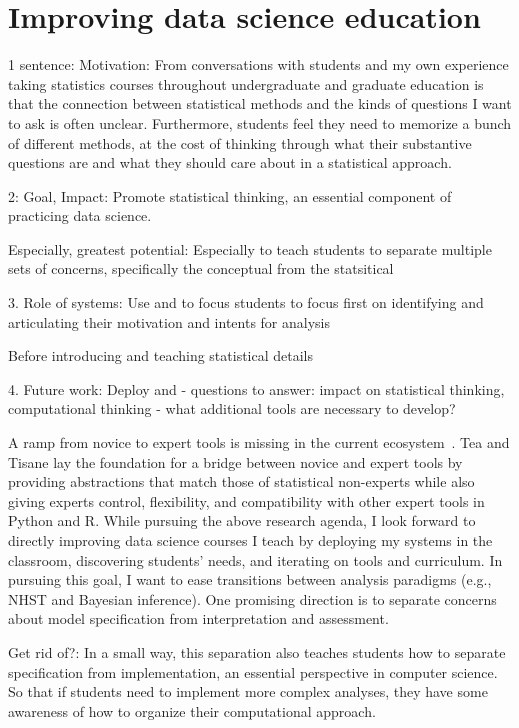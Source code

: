 \section{Improving data science education}

1 sentence: Motivation: From conversations with students and my own experience taking statistics courses
throughout undergraduate and graduate education is that the connection between
statistical methods and the kinds of questions I want to ask is often unclear.
Furthermore, students feel they need to memorize a bunch of different methods,
at the cost of thinking through what their substantive questions are and what
they should care about in a statistical approach. 

2: Goal, Impact: Promote statistical thinking, an essential component of practicing data science. 

Especially, greatest potential: Especially to teach students to separate
multiple sets of concerns, specifically the conceptual from the statsitical 

3. Role of systems: Use \tea and \tisane to focus students to focus first on identifying and
articulating their motivation and intents for analysis 

Before introducing and teaching statistical details

4. Future work: Deploy \tea and \tisane 
- questions to answer: impact on statistical thinking, computational thinking 
- what additional tools are necessary to develop? 

A ramp from novice to expert
tools is missing in the current ecosystem~\cite{mcnamara2018keyAttributes}. Tea
and Tisane lay the foundation for a bridge between novice and expert tools by
providing abstractions that match those of statistical non-experts while also
giving experts control, flexibility, and compatibility with other expert tools
in Python and R. While pursuing the above research agenda, I look forward to
directly improving data science courses I teach by deploying my systems in the
classroom, discovering students' needs, and iterating on tools and curriculum.
In pursuing this goal, I want to ease
transitions between analysis paradigms (e.g., NHST and Bayesian inference). One
promising direction is to separate concerns about model specification from
interpretation and assessment. 


Get rid of?: In a small way, this separation also teaches students how to separate
specification from implementation, an essential perspective in computer science.
So that if students need to implement more complex analyses, they have some
awareness of how to organize their computational approach. 


